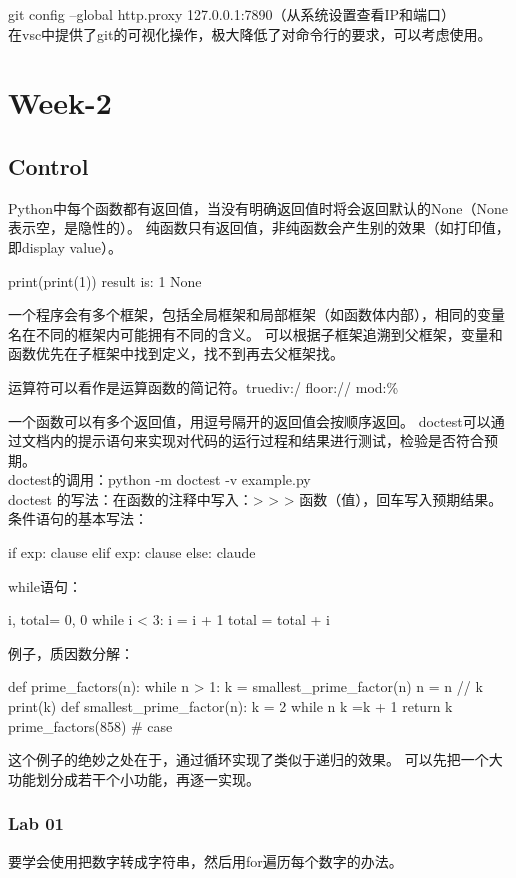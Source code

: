 \documentclass{ctexart}
\begin{document}
git config --global http.proxy 127.0.0.1:7890（从系统设置查看IP和端口）
\\在vsc中提供了git的可视化操作，极大降低了对命令行的要求，可以考虑使用。
\section{Week-2}

\subsection{Control}

Python中每个函数都有返回值，当没有明确返回值时将会返回默认的None（None表示空，是隐性的）。
纯函数只有返回值，非纯函数会产生别的效果（如打印值，即display value）。
\begin{python}
    print(print(1))
    result is:
    1
    None
\end{python}
一个程序会有多个框架，包括全局框架和局部框架（如函数体内部），相同的变量名在不同的框架内可能拥有不同的含义。
可以根据子框架追溯到父框架，变量和函数优先在子框架中找到定义，找不到再去父框架找。

运算符可以看作是运算函数的简记符。truediv:/   floor://   mod:\%

一个函数可以有多个返回值，用逗号隔开的返回值会按顺序返回。
doctest可以通过文档内的提示语句来实现对代码的运行过程和结果进行测试，检验是否符合预期。
\\doctest的调用：python -m doctest -v example.py
\\doctest 的写法：在函数的注释中写入：> >  > 函数（值），回车写入预期结果。
条件语句的基本写法：
\begin{python}
    if exp:
        clause
    elif exp:
        clause
    else:
        claude
\end{python}

while语句：
\begin{python}
    i, total= 0, 0
    while i < 3:
        i = i + 1
        total = total + i
\end{python}

例子，质因数分解：
\begin{python}
    def prime_factors(n):
    while n > 1:
        k = smallest_prime_factor(n)
        n = n // k
        print(k)
def smallest_prime_factor(n):
    k = 2
    while n %
        k =k + 1
    return k
prime_factors(858) # case
\end{python}
这个例子的绝妙之处在于，通过循环实现了类似于递归的效果。
可以先把一个大功能划分成若干个小功能，再逐一实现。 
\subsubsection{Lab 01} 
要学会使用把数字转成字符串，然后用for遍历每个数字的办法。
\end{document}
